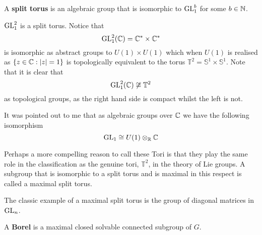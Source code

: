     \begin{definition}
        A \textbf{split torus} is an algebraic group that is isomorphic to \(\operatorname{GL}_1^b\) for some \(b\in\N\).
    \end{definition}

    \begin{example}
        \(\operatorname{GL}^2_1\) is a split torus. Notice that 
        \[\GL^2_1(\C) = \C^\ast\times \C^\ast\]
        is isomorphic as abstract groups to \(U(1)\times U(1)\) which when \(U(1)\) is realised as \(\{z\in \C : |z| = 1\}\) is topologically equivalent to the torus \(\mathbb{T}^2 = \mathbb{S}^1\times \mathbb{S}^1 \). Note that it is clear that 
        \[\GL^2_1(\C) \not\cong \mathbb{T}^2 \]
        as topological groups, as the right hand side is compact whilst the left is not.

        It was pointed out to me that as algebraic groups over \(\C\) we have the following isomorphism
        \[\GL_1 \cong U(1)\tensor_\R \C\]
    \end{example}
    
     Perhaps a more compelling reason to call these Tori is that they play the same role in the classification as the genuine tori, \(\mathbb{T}^2\), in the theory of Lie groups. A subgroup that is isomorphic to a split torus and is maximal in this respect is called a maximal split torus. 
     \begin{example}
        The classic example of a maximal split torus is the group of diagonal matrices in \(\operatorname{GL}_n\).
     \end{example}

    \begin{definition}
        A \textbf{Borel} is a maximal closed solvable connected subgroup of \(G\).
    \end{definition}

